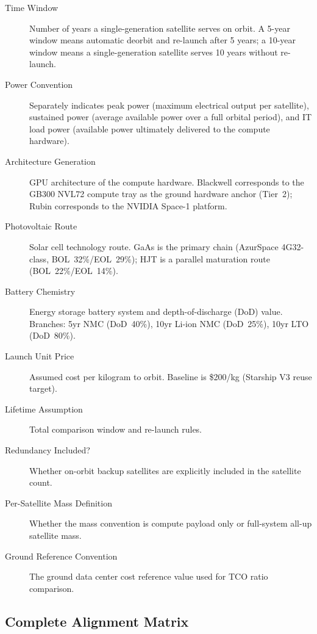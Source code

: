 \begin{description}
  \item[Time Window] Number of years a single-generation satellite serves on orbit. A 5-year window means automatic deorbit and re-launch after 5 years; a 10-year window means a single-generation satellite serves 10 years without re-launch.
  \item[Power Convention] Separately indicates peak power (maximum electrical output per satellite), sustained power (average available power over a full orbital period), and IT load power (available power ultimately delivered to the compute hardware).
  \item[Architecture Generation] GPU architecture of the compute hardware. Blackwell corresponds to the GB300 NVL72 compute tray as the ground hardware anchor (Tier~2); Rubin corresponds to the NVIDIA Space-1 platform.
  \item[Photovoltaic Route] Solar cell technology route. GaAs is the primary chain (AzurSpace 4G32-class, BOL~32\%/EOL~29\%); HJT is a parallel maturation route (BOL~22\%/EOL~14\%).
  \item[Battery Chemistry] Energy storage battery system and depth-of-discharge (DoD) value. Branches: 5yr NMC (DoD~40\%), 10yr Li-ion NMC (DoD~25\%), 10yr LTO (DoD~80\%).
  \item[Launch Unit Price] Assumed cost per kilogram to orbit. Baseline is \$200/kg (Starship V3 reuse target).
  \item[Lifetime Assumption] Total comparison window and re-launch rules.
  \item[Redundancy Included?] Whether on-orbit backup satellites are explicitly included in the satellite count.
  \item[Per-Satellite Mass Definition] Whether the mass convention is compute payload only or full-system all-up satellite mass.
  \item[Ground Reference Convention] The ground data center cost reference value used for TCO ratio comparison.
\end{description}

\subsection{Complete Alignment Matrix}


